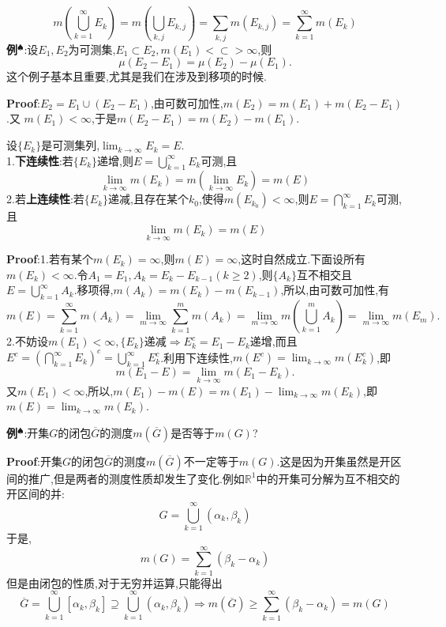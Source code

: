 $$
m\left(\bigcup_{k=1}^{\infty}E_{k}\right)=m\left(\bigcup_{k,j}E_{k,j}\right) =\sum_{k,j}m\left(E_{k,j}\right) = \sum_{k=1}^{\infty}m\left(E_{k}\right)
$$
\qquad \textbf{例}$^\spadesuit$:设$E_{1},E_{2}$为可测集,$E_{1}\subset E_{2},m(E_{1})<{\subset}>\infty$,则  
$$
\mu(E_{2}-E_{1})=\mu(E_{2})-\mu(E_{1}).
$$
这个例子基本且重要,尤其是我们在涉及到移项的时候.\par
\textbf{Proof}:$E_{2}=E_{1}\cup(E_{2}-E_{1})$,由可数可加性,$m(E_{2})=m(E_{1})+m(E_{2}-E_{1})$ .又 $m(E_{1})<\infty$,于是$m(E_{2}-E_{1})=m(E_{2})-m(E_{1})$.
\begin{tcolorbox}[colback=KuangNei,colframe=BianKuang,title=\textbf{Lebesgue测度的连续性},sharpish corners]
设$\{E_{k}\}$是可测集列,$\lim_{k\to\infty}E_{k}=E$.\\ 
1.\textbf{下连续性}:若$\{E_{k}\}$递增,则$E=\bigcup_{k=1}^{\infty}E_{k}$可测,且
$$
\lim_{k\to\infty}m(E_{k})=m(\lim_{k\to\infty}E_{k})=m(E)
$$
2.若\textbf{上连续性}:若$\{E_{k}\}$递减,且存在某个$k_0$,使得$m(E_{k_0})<\infty$,则$E=\bigcap_{k=1}^{\infty}E_{k}$可测,且
$$
\lim_{k\to\infty}m(E_{k})=m(E)
$$
\end{tcolorbox}
\textbf{Proof}:1.若有某个$m(E_{k})=\infty$,则$m(E)=\infty$,这时自然成立.下面设所有$m(E_{k})<\infty$.令$A_{1}=E_{1},A_{k}=E_{k}-E_{k-1}(k\geqslant2)$,则$\{A_{k}\}$互不相交且$E=\bigcup_{k=1}^{\infty}A_{k}$.移项得,$m(A_{k})=m(E_{k})-m(E_{k-1})$,所以,由可数可加性,有
$$
m(E)=\sum_{k=1}^{\infty}m(A_{k})=\lim_{m\to\infty}\sum_{k=1}^{m}m(A_{k})=\lim_{m\to\infty}m(\bigcup_{k=1}^{m}A_{k})=\lim_{m\to\infty}m(E_{m}).
$$
2.不妨设$m(E_1)<\infty,\{E_{k}\}$递减$\Rightarrow E_{k}^{c}=E_{1}-E_{k}$递增,而且$E^{c}=\left(\bigcap_{k=1}^{\infty}E_{k}\right)^{c}=\bigcup_{k=1}^{\infty}E_{k}^{c}$.利用下连续性,$m(E^{c})=\lim_{k\to\infty}m(E_{k}^{c})$,即  
$$
m(E_{1}-E)=\lim_{k\to\infty}m(E_{1}-E_{k}).
$$
又$m(E_1)<\infty$,所以,$m(E_{1})-m(E)=m(E_{1})-\lim_{k\to\infty}m(E_{k})$,即$m(E)=\lim_{k\to\infty}m(E_{k})$.\par
\textbf{例}$^\spadesuit$:开集$G$的闭包$\overline{G}$的测度$m(\overline{{G}})$是否等于$m(G)$?\par
\textbf{Proof}:开集$G$的闭包$\overline{G}$的测度$m(\overline{G})$不一定等于$m(G)$.这是因为开集虽然是开区间的推广,但是两者的测度性质却发生了变化.例如$\mathbb{R}^1$中的开集可分解为互不相交的开区间的并:
$$
G = \bigcup_{k=1}^{\infty} (\alpha_k, \beta_k)
$$
于是,
$$
m(G) = \sum_{k=1}^{\infty} (\beta_k - \alpha_k)
$$
但是由闭包的性质,对于无穷并运算,只能得出
$$
\overline{G} = \bigcup_{k=1}^{\infty} [\alpha_k, \beta_k] \supseteq \bigcup_{k=1}^{\infty} (\alpha_k, \beta_k) \Rightarrow m(\overline{G}) \geqslant \sum_{k=1}^{\infty} (\beta_k - \alpha_k) = m(G)
$$
